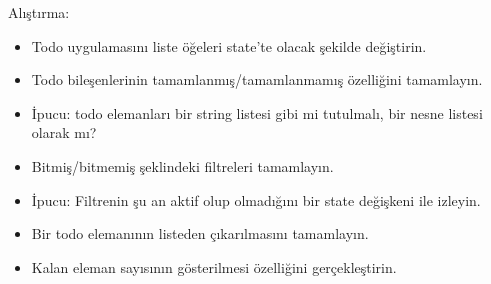\documentclass[presentation]{beamer}
\begin{document}
\begin{frame}[label=sec-9]{Alıştırma:}
\begin{itemize}
\item Todo uygulamasını liste öğeleri state'te olacak şekilde değiştirin.
\item Todo bileşenlerinin tamamlanmış/tamamlanmamış özelliğini tamamlayın.
\item İpucu: todo elemanları bir string listesi gibi mi tutulmalı, bir nesne
listesi olarak mı?
\item Bitmiş/bitmemiş şeklindeki filtreleri tamamlayın.
\item İpucu: Filtrenin şu an aktif olup olmadığını bir state değişkeni ile izleyin.
\item Bir todo elemanının listeden çıkarılmasını tamamlayın.
\item Kalan eleman sayısının gösterilmesi özelliğini gerçekleştirin.
\end{itemize}
\end{frame}
\end{document}
